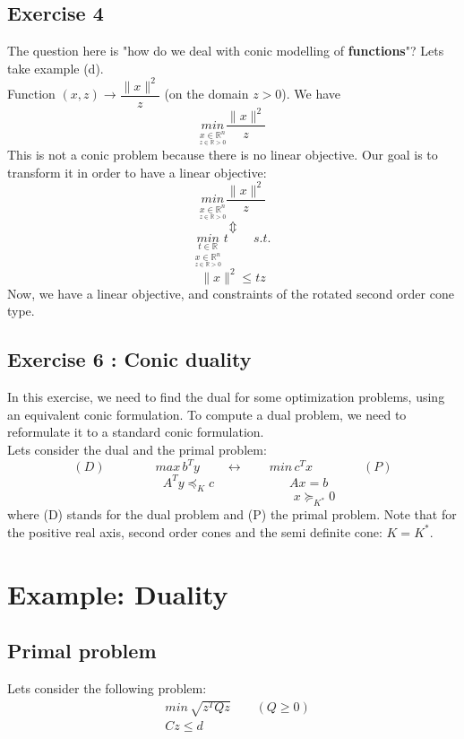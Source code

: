 \documentclass[11pt,a4paper]{article}
\begin{document}
\subsection*{Exercise 4}
The question here is "how do we deal with conic modelling of \textbf{functions}"? Lets take example (d). \\
Function $(x,z)\rightarrow \dfrac{\parallel x \parallel^2}{z}$ (on the domain $z>0$). We have $$\underset{\underset{z\in \mathbb{R}>0}{x\in \mathbb{R}^n}}{min} \dfrac{\parallel x \parallel^2}{z}$$
This is not a conic problem because there is no linear objective. Our goal is to transform it in order to have a linear objective:
$$\underset{\underset{z\in \mathbb{R}>0}{x\in \mathbb{R}^n}}{min} \dfrac{\parallel x \parallel^2}{z}$$
$$\Updownarrow$$
$$\underset{\underset{z\in \mathbb{R}>0}{x\in \mathbb{R}^n}}{\underset{t\in\mathbb{R}}{min}}\ t\qquad s.t.$$
$$\parallel x \parallel^2 \leq tz$$
Now, we have a linear objective, and constraints of the rotated second order cone type.
\subsection*{Exercise 6 : Conic duality}
In this exercise, we need to find the dual for some optimization problems, using an equivalent conic formulation. To compute a dual problem, we need to reformulate it to a standard conic formulation.\\
Lets consider the dual and the primal problem: 
$$(D)\qquad \qquad max\, b^Ty \qquad \longleftrightarrow \qquad min \, c^Tx \qquad \qquad (P)$$ 
$$ \qquad A^Ty \preceq_K c \qquad \qquad \qquad Ax=b$$
$$ \qquad \qquad \qquad \qquad \qquad \qquad \quad x\succeq_{K^*}0$$
where (D) stands for the dual problem and (P) the primal problem. 
Note that for the positive real axis, second order cones and the semi definite cone: $K=K^*$.\\

\section{Example: Duality}
\subsection{Primal problem}
Lets consider the following problem: 
\begin{align*}
&min \, \sqrt{z^TQz} \qquad (Q\geq 0)\\
&Cz \leq d
\end{align*}
\end{document}
